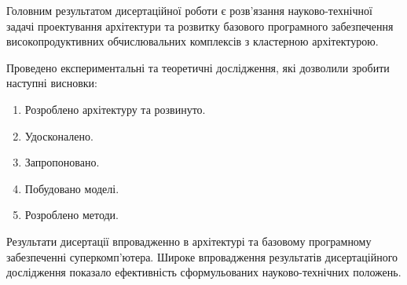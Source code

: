 Головним результатом дисертаційної роботи є розв'язання науково-технічної задачі проектування архітектури та розвитку базового програмного забезпечення високопродуктивних обчислювальних комплексів з кластерною архітектурою. 

Проведено експериментальні та теоретичні дослідження, які дозволили зробити наступні висновки:

\begin{enumerate}
\item Розроблено архітектуру та розвинуто.
\item Удосконалено. 
\item Запропоновано.
\item Побудовано моделі.
\item Розроблено методи.
\end{enumerate}

Результати дисертації впровадженно в архітектурі та базовому програмному забезпеченні суперкомп'ютера.
Широке впровадження результатів дисертаційного дослідження показало ефективність сформульованих науково-технічних положень.




